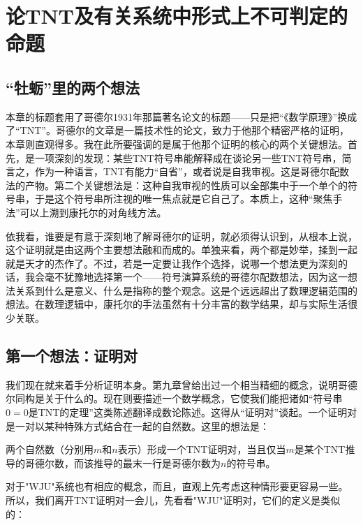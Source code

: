 
\chapter{论TNT及有关系统中形式上不可判定的命题}

\section{“牡蛎”里的两个想法}

本章的标题套用了哥德尔1931年那篇著名论文的标题——只是把“《数学原理》”换成了“TNT”。哥德尔的文章是一篇技术性的论文，致力于他那个精密严格的证明，本章则直观得多。我在此所要强调的是属于他那个证明的核心的两个关键想法。首先，是一项深刻的发现：某些TNT符号串能解释成在谈论另一些TNT符号串，简言之，作为一种语言，TNT有能力“自省”，或者说是自我审视。这是哥德尔配数法的产物。第二个关键想法是：这种自我审视的性质可以全部集中于一个单个的符号串，于是这个符号串所注视的唯一焦点就是它自己了。本质上，这种“聚焦手法”可以上溯到康托尔的对角线方法。

依我看，谁要是有意于深刻地了解哥德尔的证明，就必须得认识到，从根本上说，这个证明就是由这两个主要想法融和而成的。单独来看，两个都是妙举，揉到一起就是天才的杰作了。不过，若是一定要让我作个选择，说哪一个想法更为深刻的话，我会毫不犹豫地选择第一个——符号演算系统的哥德尔配数想法，因为这一想法关系到什么是意义、什么是指称的整个观念。这是个远远超出了数理逻辑范围的想法。在数理逻辑中，康托尔的手法虽然有十分丰富的数学结果，却与实际生活很少关联。

\section{第一个想法：证明对}

我们现在就来着手分析证明本身。第九章曾给出过一个相当精细的概念，说明哥德尔同构是关于什么的。现在则要描述一个数学概念，它使我们能把诸如“符号串$0=0$是TNT的定理”这类陈述翻译成数论陈述。这得从“证明对”谈起。一个证明对是一对以某种特殊方式结合在一起的自然数。这里的想法是：

\begin{block}
两个自然数（分别用$m$和$n$表示）形成一个TNT证明对，当且仅当$m$是某个TNT推导的哥德尔数，而该推导的最末一行是哥德尔数为$n$的符号串。
\end{block}
对于"WJU"系统也有相应的概念，而且，直观上先考虑这种情形要更容易一些。所以，我们离开TNT证明对一会儿，先看看"WJU"证明对，它们的定义是类似的：

